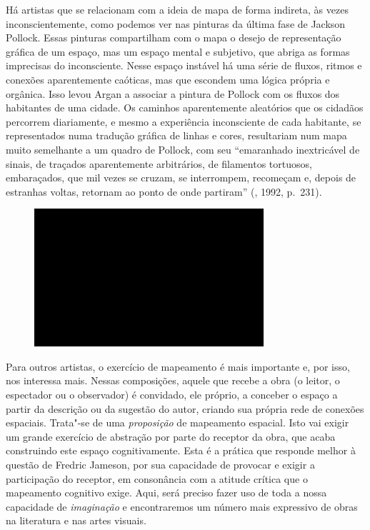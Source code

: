 Há artistas que se relacionam com a ideia de mapa de forma indireta, às
vezes inconscientemente, como podemos ver nas pinturas da última fase de
Jackson Pollock. Essas pinturas compartilham com o mapa o desejo de
representação gráfica de um espaço, mas um espaço mental e subjetivo,
que abriga as formas imprecisas do inconsciente. Nesse espaço instável
há uma série de fluxos, ritmos e conexões aparentemente caóticas, mas
que escondem uma lógica própria e orgânica. Isso levou Argan a associar
a pintura de Pollock com os fluxos dos habitantes de uma cidade. Os
caminhos aparentemente aleatórios que os cidadãos percorrem diariamente,
e mesmo a experiência inconsciente de cada habitante, se representados
numa tradução gráfica de linhas e cores, resultariam num mapa muito
semelhante a um quadro de Pollock, com seu ``emaranhado inextricável de
sinais, de traçados aparentemente arbitrários, de filamentos tortuosos,
embaraçados, que mil vezes se cruzam, se interrompem, recomeçam e,
depois de estranhas voltas, retornam ao ponto de onde partiram''
(, 1992, p.~231).

\begin{figure}[!ht]
\centering
 \includegraphics[width=85mm]{./imgs/im1.jpg}
\caption{\tiny{}}
\end{figure}

Para outros artistas, o exercício de mapeamento é mais importante e, por
isso, nos interessa mais. Nessas composições, aquele que recebe a obra (o
leitor, o espectador ou o observador) é convidado, ele próprio, a
conceber o espaço a partir da descrição ou da sugestão do autor, criando
sua própria rede de conexões espaciais. Trata"-se de uma
\emph{proposição} de mapeamento espacial. Isto vai exigir um
grande exercício de abstração por parte do receptor da obra, que acaba
construindo este espaço cognitivamente. Esta é a prática que responde
melhor à questão de Fredric Jameson, por sua capacidade de provocar e
exigir a participação do receptor, em consonância com a atitude crítica
que o mapeamento cognitivo exige. Aqui, será preciso fazer uso de toda a
nossa capacidade de \emph{imaginação} e encontraremos um número mais
expressivo de obras na literatura e nas artes visuais.

